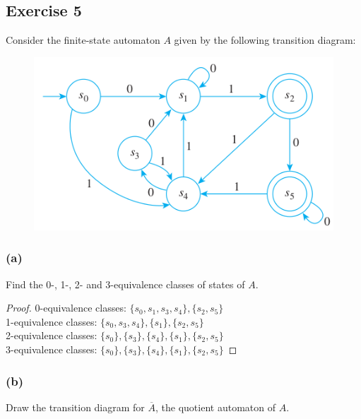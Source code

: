 \documentclass[14pt]{extarticle}
\begin{document}
\subsection{Exercise 5}
Consider the finite-state automaton \(A\) given by the following transition diagram:

\begin{figure}[ht!]
    \centering
    \includegraphics[scale=0.5]{../images/12.3.5.png}
\end{figure}

\subsubsection{(a)}
Find the 0-, 1-, 2- and 3-equivalence classes of states of \(A\).

\begin{proof}
    0-equivalence classes: \(\{s_0, s_1, s_3, s_4\}, \{s_2, s_5\}\) \\
    1-equivalence classes: \(\{s_0, s_3, s_4\}, \{s_1\}, \{s_2, s_5\}\) \\
    2-equivalence classes: \(\{s_0\}, \{s_3\}, \{s_4\}, \{s_1\}, \{s_2, s_5\}\) \\
    3-equivalence classes: \(\{s_0\}, \{s_3\}, \{s_4\}, \{s_1\}, \{s_2, s_5\}\)
\end{proof}

\subsubsection{(b)}
Draw the transition diagram for \(\overline{A}\), the quotient automaton of \(A\).
\end{document}
